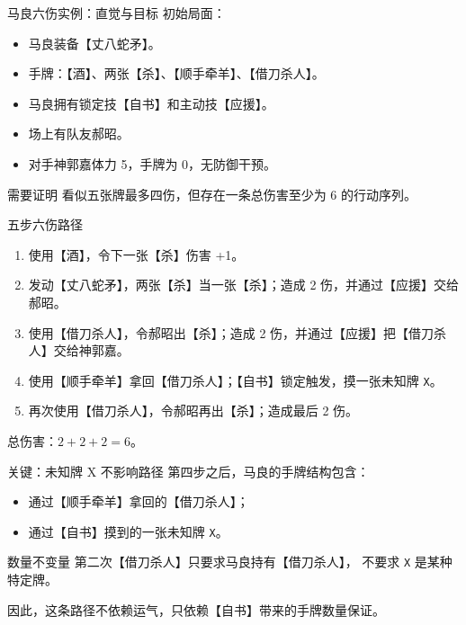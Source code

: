 \documentclass[UTF8,aspectratio=169]{ctexbeamer}
\newcommand{\code}[1]{\texttt{#1}}
\begin{document}
\begin{frame}{马良六伤实例：直觉与目标}
  初始局面：

  \begin{itemize}
    \item 马良装备【丈八蛇矛】。
    \item 手牌：【酒】、两张【杀】、【顺手牵羊】、【借刀杀人】。
    \item 马良拥有锁定技【自书】和主动技【应援】。
    \item 场上有队友郝昭。
    \item 对手神郭嘉体力 5，手牌为 0，无防御干预。
  \end{itemize}

  \begin{block}{需要证明}
    看似五张牌最多四伤，但存在一条总伤害至少为 6 的行动序列。
  \end{block}
\end{frame}

\begin{frame}{五步六伤路径}
  \begin{enumerate}
    \item 使用【酒】，令下一张【杀】伤害 +1。
    \item 发动【丈八蛇矛】，两张【杀】当一张【杀】；造成 2 伤，并通过【应援】交给郝昭。
    \item 使用【借刀杀人】，令郝昭出【杀】；造成 2 伤，并通过【应援】把【借刀杀人】交给神郭嘉。
    \item 使用【顺手牵羊】拿回【借刀杀人】；【自书】锁定触发，摸一张未知牌 \code{X}。
    \item 再次使用【借刀杀人】，令郝昭再出【杀】；造成最后 2 伤。
  \end{enumerate}

  \vspace{0.5em}
  总伤害：$2 + 2 + 2 = 6$。
\end{frame}

\begin{frame}{关键：未知牌 X 不影响路径}
  第四步之后，马良的手牌结构包含：

  \begin{itemize}
    \item 通过【顺手牵羊】拿回的【借刀杀人】；
    \item 通过【自书】摸到的一张未知牌 \code{X}。
  \end{itemize}

  \begin{block}{数量不变量}
    第二次【借刀杀人】只要求马良持有【借刀杀人】，
    不要求 \code{X} 是某种特定牌。
  \end{block}

  因此，这条路径不依赖运气，只依赖【自书】带来的手牌数量保证。
\end{frame}
\end{document}
